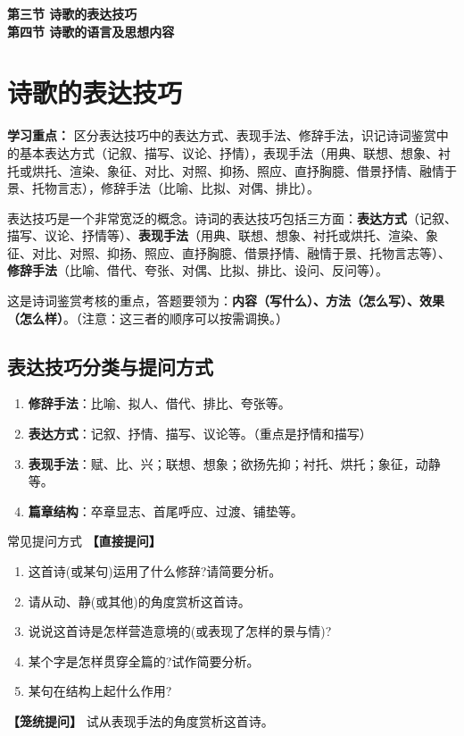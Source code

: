 \documentclass[11pt, a4paper]{ctexart}
\begin{document}
\begin{center}
    {\Huge \bfseries 第三节 诗歌的表达技巧} \\
    \vspace{0.5cm}
    {\Huge \bfseries 第四节 诗歌的语言及思想内容}
\end{center}

\tableofcontents
\newpage

\section{诗歌的表达技巧}

\textbf{学习重点：}
区分表达技巧中的表达方式、表现手法、修辞手法，识记诗词鉴赏中的基本表达方式（记叙、描写、议论、抒情），表现手法（用典、联想、想象、衬托或烘托、渲染、象征、对比、对照、抑扬、照应、直抒胸臆、借景抒情、融情于景、托物言志），修辞手法（比喻、比拟、对偶、排比）。

表达技巧是一个非常宽泛的概念。诗词的表达技巧包括三方面：\textbf{表达方式}（记叙、描写、议论、抒情等）、\textbf{表现手法}（用典、联想、想象、衬托或烘托、渲染、象征、对比、对照、抑扬、照应、直抒胸臆、借景抒情、融情于景、托物言志等）、\textbf{修辞手法}（比喻、借代、夸张、对偶、比拟、排比、设问、反问等）。

这是诗词鉴赏考核的重点，答题要领为：\textbf{内容（写什么）、方法（怎么写）、效果（怎么样）}。（注意：这三者的顺序可以按需调换。）

\subsection{表达技巧分类与提问方式}
\begin{enumerate}
    \item \textbf{修辞手法}：比喻、拟人、借代、排比、夸张等。
    \item \textbf{表达方式}：记叙、抒情、描写、议论等。（重点是抒情和描写）
    \item \textbf{表现手法}：赋、比、兴；联想、想象；欲扬先抑；衬托、烘托；象征，动静等。
    \item \textbf{篇章结构}：卒章显志、首尾呼应、过渡、铺垫等。
\end{enumerate}

\begin{tipsbox}{常见提问方式}
\textbf{【直接提问】}
\begin{enumerate}
    \item 这首诗(或某句)运用了什么修辞?请简要分析。
    \item 请从动、静(或其他)的角度赏析这首诗。
    \item 说说这首诗是怎样营造意境的(或表现了怎样的景与情)?
    \item 某个字是怎样贯穿全篇的?试作简要分析。
    \item 某句在结构上起什么作用?
\end{enumerate}
\textbf{【笼统提问】} 试从表现手法的角度赏析这首诗。
\end{tipsbox}
\end{document}
